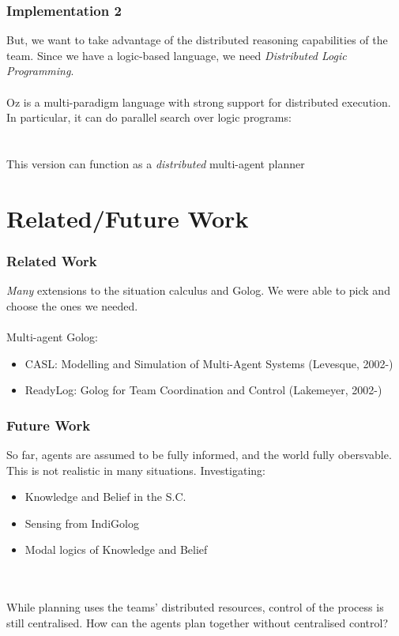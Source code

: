\documentclass{beamer}
\begin{document}
\begin{frame}
\frametitle{Implementation 2}
But, we want to take advantage of the distributed reasoning capabilities of
the team.  Since we have a logic-based language, we need
\emph{Distributed Logic Programming}.\\
\ \\
Oz is a multi-paradigm language with strong support for distributed execution.
In particular, it can do parallel search over logic programs:\\
\ \\
\ \\
This version can function as a \emph{distributed} multi-agent planner
\end{frame}

\section{Related/Future Work}

\begin{frame}
\frametitle{Related Work}
\emph{Many} extensions to the situation calculus and Golog.  We were able to
pick and choose the ones we needed.\\
\ \\
Multi-agent Golog:
\begin{itemize}
  \item CASL: Modelling and Simulation of Multi-Agent Systems (Levesque, 2002-)
  \item ReadyLog: Golog for Team Coordination and Control (Lakemeyer, 2002-)
\end{itemize}
\end{frame}

\begin{frame}
\frametitle{Future Work}
So far, agents are assumed to be fully informed, and the world
fully obersvable.  This is not realistic in many situations. 
Investigating:
\begin{itemize}
  \item Knowledge and Belief in the S.C.
  \item Sensing from IndiGolog
  \item Modal logics of Knowledge and Belief
\end{itemize}
\ \\
\ \\
While planning uses the teams' distributed resources, control of the
process is still centralised.  How can the agents plan together without
centralised control?
\end{frame}
\end{document}
